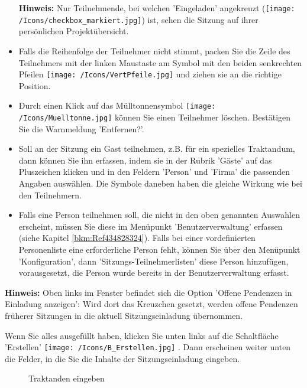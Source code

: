 \begin{itemize}
\textbf{Hinweis:} Nur Teilnehmende, bei welchen 'Eingeladen' angekreuzt (\texttt{[image: /Icons/checkbox\_markiert.jpg]}) ist, sehen die Sitzung auf ihrer persönlichen Projektübersicht.
\item 
Falls die Reihenfolge der Teilnehmer nicht stimmt, packen Sie die Zeile des Teilnehmers mit der linken Maustaste am Symbol mit den beiden senkrechten Pfeilen \texttt{[image: /Icons/VertPfeile.jpg]}  und ziehen sie an die richtige Position.
\item 
Durch einen Klick auf das Mülltonnensymbol \texttt{[image: /Icons/Muelltonne.jpg]}  können Sie einen Teilnehmer löschen. Bestätigen Sie die Warnmeldung 'Entfernen?'.
\item 
Soll an der Sitzung ein Gast teilnehmen, z.B. für ein spezielles Traktandum, dann können Sie ihn erfassen, indem sie in der Rubrik 'Gäste' auf das Pluszeichen klicken und in den Feldern 'Person' und 'Firma' die passenden Angaben auswählen. Die Symbole daneben haben die gleiche Wirkung wie bei den Teilnehmern.
\item 
Falls eine Person teilnehmen soll, die nicht in den oben genannten Auswahlen erscheint, müssen Sie diese im Menüpunkt 'Benutzerverwaltung' erfassen (siehe Kapitel \ref{bkm:Ref434828324}). Falls bei einer vordefinierten Personenliste eine erforderliche Person fehlt, können Sie über den Menüpunkt 'Konfiguration', dann 'Sitzungs-Teilnehmerlisten' diese Person hinzufügen, vorausgesetzt, die Person wurde bereits in der Benutzerverwaltung erfasst.
\end{itemize}

\vspace{\baselineskip}

\textbf{Hinweis:} Oben links im Fenster befindet sich die Option 'Offene Pendenzen in Einladung anzeigen': Wird dort das Kreuzchen gesetzt, werden offene Pendenzen früherer Sitzungen in die aktuell Sitzungseinladung übernommen.

\vspace{\baselineskip}

Wenn Sie alles ausgefüllt haben, klicken Sie unten links auf die Schaltfläche 'Erstellen' \texttt{[image: /Icons/B\_Erstellen.jpg]} . Dann erscheinen weiter unten die Felder, in die Sie die Inhalte der Sitzungseinladung eingeben.

\begin{figure}[H]
\caption{Traktanden eingeben}
\end{figure}

